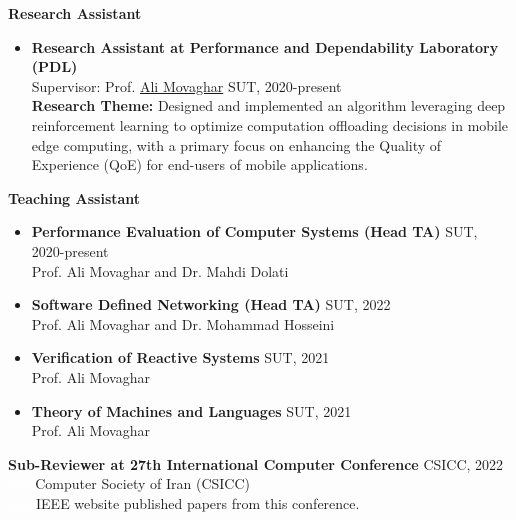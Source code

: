 \documentclass[11pt]{article}
\begin{document}
\large\large\textbf{Research Assistant} \vspace{-2mm}
\begin{itemize}
	\item \textbf{Research Assistant at Performance and Dependability Laboratory (PDL)} \href{https://pdl.ce.sharif.edu}{\small \faExternalLink}
	\\ Supervisor: Prof. \href{https://scholar.google.com/citations?user=BXNelwwAAAAJ\&hl=en}{Ali Movaghar} \hfill SUT, 2020-present\\
	\textbf{Research Theme:} Designed and implemented an algorithm leveraging deep reinforcement learning to optimize computation offloading decisions in mobile edge computing, with a primary focus on enhancing the Quality of Experience (QoE) for end-users of mobile applications.


	
\end{itemize}
\large\large\textbf{Teaching Assistant}  \vspace{-2mm}

\begin{itemize}

	\item \textbf{Performance Evaluation of Computer Systems (Head TA)} \hfill SUT, 2020-present
		\\ Prof. Ali Movaghar and Dr. Mahdi Dolati \vspace{-2mm} \href{https://scholar.google.com/citations?user=b7A2CXYAAAAJ&hl=en&oi=ao}{\small \faExternalLink}
	\item \textbf{Software Defined Networking (Head TA)} \hfill SUT, 2022
		\\ Prof. Ali Movaghar and Dr. Mohammad Hosseini \vspace{-2mm} \href{https://scholar.google.com/citations?user=iRO-DVoAAAAJ&hl=en&oi=ao}{\small \faExternalLink}
	\item \textbf{Verification of Reactive Systems} \hfill SUT, 2021
		\\ Prof. Ali Movaghar \vspace{-2mm}
	\item \textbf{Theory of Machines and Languages} \hfill SUT, 2021
		\\ Prof. Ali Movaghar \vspace{-2mm}

\end{itemize}
\large\large\textbf{Sub-Reviewer at 27th International Computer Conference} \hfill CSICC, 2022 \\
  \textcolor{white}{iiiiiii}Computer Society of Iran (CSICC) \href{http://csi.org.ir/csicc2022/index-2.html}{\small \faExternalLink}\\ \textcolor{white}{iiiiii} IEEE website published papers from this conference. \href{https://ieeexplore.ieee.org/xpl/conhome/9780464/proceeding}{\small \faExternalLink}
  
\end{document}
